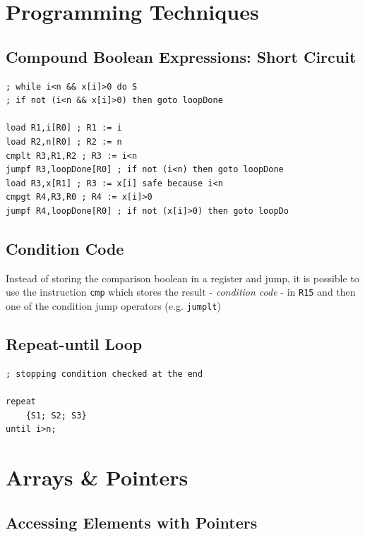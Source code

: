 \documentclass[english,course]{Notes}
\newcommand{\ita}[1]{\textit{#1}}
\newcommand{\code}{\texttt}
\begin{document}
{

\section{Programming Techniques}

\subsection{Compound Boolean Expressions: Short Circuit}


\begin{lstlisting}
; while i<n && x[i]>0 do S
; if not (i<n && x[i]>0) then goto loopDone

load R1,i[R0] ; R1 := i
load R2,n[R0] ; R2 := n
cmplt R3,R1,R2 ; R3 := i<n
jumpf R3,loopDone[R0] ; if not (i<n) then goto loopDone
load R3,x[R1] ; R3 := x[i] safe because i<n
cmpgt R4,R3,R0 ; R4 := x[i]>0
jumpf R4,loopDone[R0] ; if not (x[i]>0) then goto loopDo
\end{lstlisting}

\subsection{Condition Code}

\par{Instead of storing the comparison boolean in a register and jump, it is possible to use the instruction \code{cmp} which stores the result - \ita{condition code} - in \code{R15} and then one of the condition jump operators (e.g. \code{jumplt})}

\subsection{Repeat-until Loop}

\begin{lstlisting}
; stopping condition checked at the end

repeat
	{S1; S2; S3}
until i>n;
\end{lstlisting}

\section{Arrays \& Pointers}

\subsection{Accessing Elements with Pointers}

}
\end{document}
